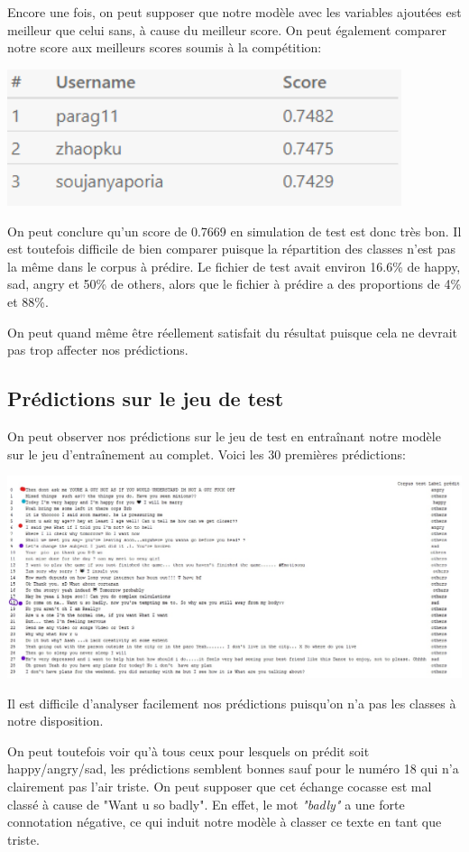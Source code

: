 \documentclass[12pt,french]{article}
\begin{document}
Encore une fois, on peut supposer que notre modèle avec les variables ajoutées est meilleur que celui sans, à cause du meilleur score. On peut également comparer notre score aux meilleurs scores soumis à la compétition:

\includegraphics[width=\linewidth,height=4cm,keepaspectratio]{meilleurs_scores}

On peut conclure qu'un score de 0.7669 en simulation de test est donc très bon. Il est toutefois difficile de bien comparer puisque la répartition des classes n'est pas la même dans le corpus à prédire. Le fichier de test avait environ 16.6\% de happy, sad, angry et 50\% de others, alors que le fichier à prédire a des proportions de 4\% et 88\%. 

On peut quand même être réellement satisfait du résultat puisque cela ne devrait pas trop affecter nos prédictions.

\subsection*{Prédictions sur le jeu de test}
On peut observer nos prédictions sur le jeu de test en entraînant notre modèle sur le jeu d'entraînement au complet. Voici les 30 premières prédictions:

\includegraphics[width=\linewidth,keepaspectratio]{couleur_predictions}

Il est difficile d'analyser facilement nos prédictions puisqu'on n'a pas les classes à notre disposition. 

On peut toutefois voir qu'à tous ceux pour lesquels on prédit soit happy/angry/sad, les prédictions semblent bonnes sauf pour le numéro 18 qui n'a clairement pas l'air triste. On peut supposer que cet échange cocasse est mal classé à cause de "Want u so badly". En effet, le mot \emph{"badly"} a une forte connotation négative, ce qui induit notre modèle à classer ce texte en tant que triste. 
\end{document}
